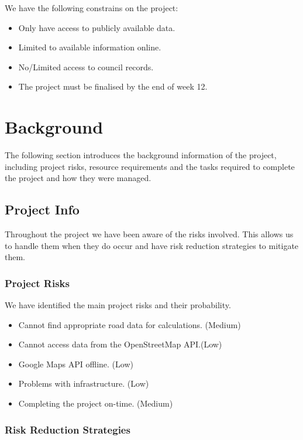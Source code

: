 \documentclass[a4paper,11pt]{article}
\begin{document}
We have the following constrains on the project:

\begin{itemize}
  \item Only have access to publicly available data.
  \item Limited to available information online.
  \item No/Limited access to council records.
  \item The project must be finalised by the end of week 12.
\end{itemize}

\section{Background}

The following section introduces the background information of the project,
including project risks, resource requirements and the tasks required to
complete the project and how they were managed.

\subsection{Project Info}

Throughout the project we have been aware of the risks involved. This allows us
to handle them when they do occur and have risk reduction strategies to mitigate
them.

\subsubsection{Project Risks}

We have identified the main project risks and their probability.

\begin{itemize}
  \item Cannot find appropriate road data for calculations. (Medium)
  \item Cannot access data from the OpenStreetMap API.\@ (Low)
  \item Google Maps API offline. (Low)
  \item Problems with infrastructure. (Low)
  \item Completing the project on-time. (Medium)
\end{itemize}

\subsubsection{Risk Reduction Strategies}
\end{document}
